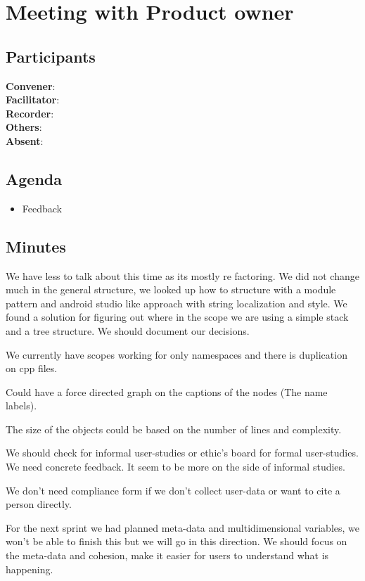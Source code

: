 \section*{Meeting with Product owner}

\subsection*{Participants}
\textbf{Convener}: \productowner{} \\
\textbf{Facilitator}: \facilitator{}  \\
\textbf{Recorder}: \scrummaster{}  \\
\textbf{Others}: \groupleader{} \\
\textbf{Absent}: 

\subsection*{Agenda}
\begin{itemize}
    \item Feedback
\end{itemize}

\subsection*{Minutes}
We have less to talk about this time as its mostly re factoring. We did not change much in the general structure, we looked up how to structure with a module pattern and android studio  like approach with string localization and style. We found a solution for figuring out where in the scope we are using a simple stack and a tree structure. We should document our decisions.

We currently have scopes working for only namespaces and there is duplication on cpp files. 

Could have a force directed graph on the captions of the nodes (The name labels). 

The size of the objects could be based on the number of lines and complexity. 

We should check for informal user-studies or ethic's board for formal user-studies. We need concrete feedback. It seem to be more on the side of informal studies. 

We don't need compliance form if we don't collect user-data or want to cite a person directly. 

For the next sprint we had planned meta-data and multidimensional variables, we won't be able to finish this but we will go in this direction. We should focus on the meta-data and cohesion, make it easier for users to understand what is happening.

\newpage